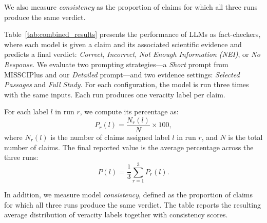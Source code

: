 \documentclass[11pt]{article}
\begin{document}
We also measure \emph{consistency} as the proportion of claims for which all three
runs produce the same verdict.


Table~\ref{tab:combined_results} presents the performance of LLMs as fact-checkers, where each model is given a claim and its associated scientific evidence and predicts a final verdict: \textit{Correct}, \textit{Incorrect}, \textit{Not Enough Information (NEI)}, or \textit{No Response}. 
We evaluate two prompting strategies—a \textit{Short} prompt from MISSCIPlus and our \textit{Detailed} prompt—and two evidence settings: \textit{Selected Passages} and \textit{Full Study}. 
For each configuration, the model is run three times with the same inputs. Each run produces one veracity label per claim.

For each label $l$ in run $r$, we compute its percentage as:
\[
P_r(l)=\frac{N_r(l)}{N}\times 100,
\]
where $N_r(l)$ is the number of claims assigned label $l$ in run $r$, and $N$ is the total number of claims. 
The final reported value is the average percentage across the three runs:
\[
P(l)=\frac{1}{3}\sum_{r=1}^{3}P_r(l).
\]

In addition, we measure model \emph{consistency}, defined as the proportion of claims for which all three runs produce the same verdict. The table reports the resulting average distribution of veracity labels together with consistency scores.
\end{document}
